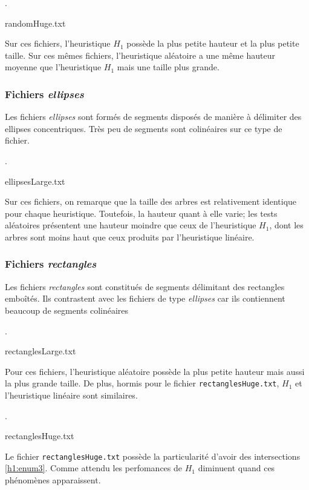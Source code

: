 \begin{table}[h].
\caption{randomHuge.txt}

\end{table}

Sur ces fichiers, l'heuristique $H_1$
possède la plus petite hauteur et la plus petite taille.
Sur ces mêmes fichiers, l'heuristique aléatoire a une même hauteur moyenne
que l'heuristique $H_1$ mais une taille plus grande.
\subsubsection*{Fichiers \og\emph{ellipses}\fg}
Les fichiers \og\emph{ellipses}\fg{} sont formés de segments disposés de manière
à délimiter des ellipses concentriques. Très peu de segments
sont colinéaires sur ce type de fichier.

\begin{table}[h].
\caption{ellipsesLarge.txt}

\end{table}

Sur ces fichiers, on remarque que la taille des arbres
est relativement identique pour chaque heuristique.
Toutefois, la hauteur quant à elle varie; les tests aléatoires présentent
une hauteur moindre que ceux de l'heuristique $H_1$, dont les arbres
sont moins haut que ceux produits par l'heuristique linéaire.

\subsubsection*{Fichiers \og\emph{rectangles}\fg}
Les fichiers \og\emph{rectangles}\fg{} sont constitués de segments
délimitant des rectangles emboîtés. Ils contrastent avec les fichiers
de type \og\emph{ellipses}\fg{} car ils contiennent beaucoup de segments
colinéaires

\begin{table}[h].
\caption{rectanglesLarge.txt}

\end{table}

Pour ces fichiers, l'heuristique aléatoire possède
la plus petite hauteur mais aussi la plus grande taille.
De plus, hormis pour le fichier \texttt{rectanglesHuge.txt}, $H_1$
et l'heuristique linéaire sont similaires.

\begin{table}[h].
\caption{rectanglesHuge.txt}

\end{table}

Le fichier \texttt{rectanglesHuge.txt} possède la particularité d'avoir des
intersections \ref{h1:enum3}. Comme attendu les perfomances de $H_1$
diminuent quand ces phénomènes apparaissent.

